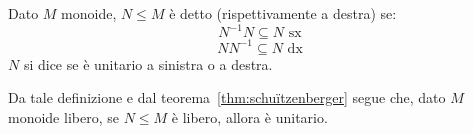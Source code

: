 \begin{definition}
  Dato \(M\) monoide, \(N \leq M\) è detto  (rispettivamente a destra) se:
  \[N^{-1}N \subseteq N \text{ sx}\]
  \[NN^{-1} \subseteq N \text{ dx}\]
  \(N\) si dice  se è unitario a sinistra o a destra.
\end{definition}

Da tale definizione e dal teorema~\ref{thm:schuïtzenberger} segue che, dato \(M\) monoide libero, se \(N \leq M\) è libero, allora è unitario.

